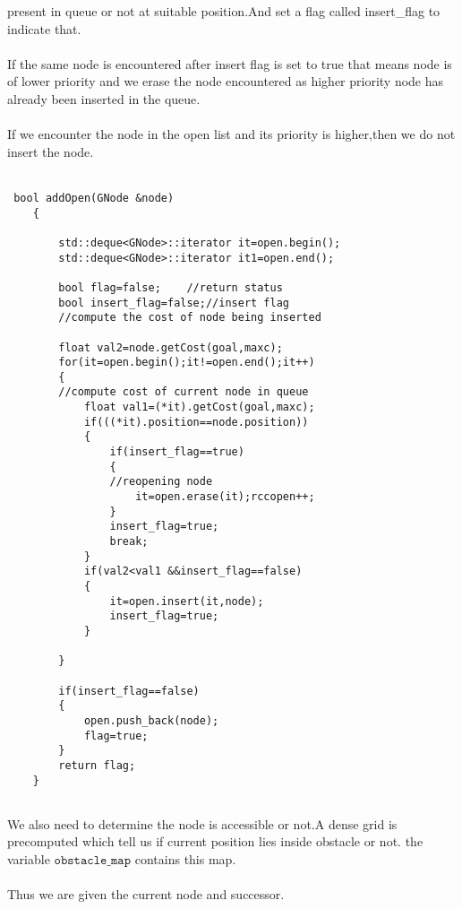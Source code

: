 \documentclass[fontsize=12pt, %
                             paper=a4, %
                             oneside, %
                             captions=tableheading,
                             index=totoc,
                             hyperref]{labbook}
\begin{document}
present in queue or not at suitable position.And set a flag called insert\_flag to indicate that.
\\\\
If the same node is encountered after insert flag is set to true that means node is of lower
priority and we erase the node encountered as higher priority node has already been inserted in the queue.
\\\\
If we encounter the node in the open list and its priority is higher,then we do not insert the
node.
\\\\
\begin{verbatim}
 bool addOpen(GNode &node)
    {

        std::deque<GNode>::iterator it=open.begin();
        std::deque<GNode>::iterator it1=open.end();
        
        bool flag=false;	//return status
        bool insert_flag=false;//insert flag
        //compute the cost of node being inserted
        
        float val2=node.getCost(goal,maxc);
        for(it=open.begin();it!=open.end();it++)
        {
	    //compute cost of current node in queue
            float val1=(*it).getCost(goal,maxc);
            if(((*it).position==node.position))
            {
                if(insert_flag==true)
                {
                //reopening node
                    it=open.erase(it);rccopen++;                                        
                }
                insert_flag=true;
                break;
            }
            if(val2<val1 &&insert_flag==false)
            {                
                it=open.insert(it,node);                                
                insert_flag=true;
            }

        }

        if(insert_flag==false)
        {            
            open.push_back(node);
            flag=true;
        }        
        return flag;
    }
 
\end{verbatim}
We also need to determine the node is accessible or not.A dense grid is precomputed
which tell us if current position lies inside obstacle or not.
the variable $\texttt{obstacle\_map}$ contains this map.
\\\\
Thus we are given the current node and successor.
\\\\
\end{document}
